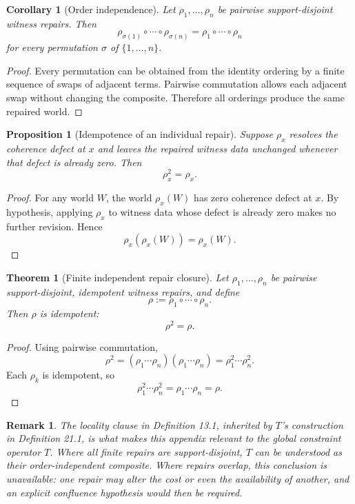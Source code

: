 \documentclass[11pt]{book}
\newtheorem*{appendixproposition}{Proposition}
\newtheorem*{appendixtheorem}{Theorem}
\newtheorem*{appendixcorollary}{Corollary}
\newtheorem*{appendixremark}{Remark}
\begin{document}
\begin{appendixcorollary}[Order independence]
Let $\rho_1,\dots,\rho_n$ be pairwise support-disjoint witness repairs.
Then
\[
\rho_{\sigma(1)}\circ\cdots\circ\rho_{\sigma(n)}
=
\rho_1\circ\cdots\circ\rho_n
\]
for every permutation $\sigma$ of $\{1,\dots,n\}$.
\end{appendixcorollary}

\begin{proof}
Every permutation can be obtained from the identity ordering by a finite
sequence of swaps of adjacent terms. Pairwise commutation allows each
adjacent swap without changing the composite. Therefore all orderings
produce the same repaired world.
\end{proof}

\begin{appendixproposition}[Idempotence of an individual repair]
Suppose $\rho_x$ resolves the coherence defect at $x$ and leaves the
repaired witness data unchanged whenever that defect is already zero.
Then
\[
\rho_x^2=\rho_x.
\]
\end{appendixproposition}

\begin{proof}
For any world $W$, the world $\rho_x(W)$ has zero coherence defect at
$x$. By hypothesis, applying $\rho_x$ to witness data whose defect is
already zero makes no further revision. Hence
\[
\rho_x(\rho_x(W))=\rho_x(W).
\]
\end{proof}

\begin{appendixtheorem}[Finite independent repair closure]
Let $\rho_1,\dots,\rho_n$ be pairwise support-disjoint, idempotent witness
repairs, and define
\[
\rho:=\rho_1\circ\cdots\circ\rho_n.
\]
Then $\rho$ is idempotent:
\[
\rho^2=\rho.
\]
\end{appendixtheorem}

\begin{proof}
Using pairwise commutation,
\[
\rho^2
=
(\rho_1\cdots\rho_n)(\rho_1\cdots\rho_n)
=
\rho_1^2\cdots\rho_n^2.
\]
Each $\rho_k$ is idempotent, so
\[
\rho_1^2\cdots\rho_n^2
=
\rho_1\cdots\rho_n
=
\rho.
\]
\end{proof}

\begin{appendixremark}
The locality clause in Definition 13.1, inherited by $T$'s construction in Definition 21.1, is what makes this appendix
relevant to the global constraint operator $T$. Where all finite repairs
are support-disjoint, $T$ can be understood as their order-independent
composite. Where repairs overlap, this conclusion is unavailable: one
repair may alter the cost or even the availability of another, and an
explicit confluence hypothesis would then be required.
\end{appendixremark}
\end{document}
